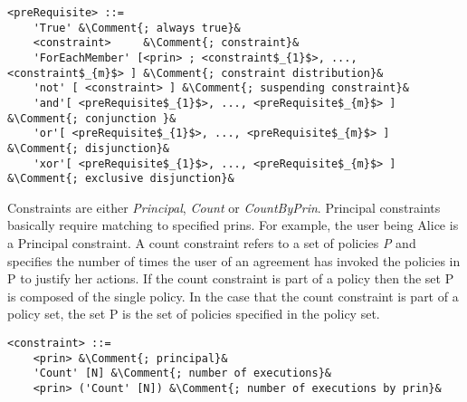 
\lstset{mathescape, language=AST, escapechar=\&}  
\begin{lstlisting}[frame=single, caption={preRequisite},label={lst:preRequisiteast}]
<preRequisite> ::=  
	'True' &\Comment{; always true}&
	<constraint>	 &\Comment{; constraint}&
	'ForEachMember' [<prin> ; <constraint$_{1}$>, ..., <constraint$_{m}$> ]	&\Comment{; constraint distribution}&
	'not' [ <constraint> ] &\Comment{; suspending constraint}&
	'and'[ <preRequisite$_{1}$>, ..., <preRequisite$_{m}$> ] &\Comment{; conjunction }&
	'or'[ <preRequisite$_{1}$>, ..., <preRequisite$_{m}$> ] &\Comment{; disjunction}&
	'xor'[ <preRequisite$_{1}$>, ..., <preRequisite$_{m}$> ] &\Comment{; exclusive disjunction}&
\end{lstlisting}

Constraints are either \emph{Principal}, \emph{Count} or \emph{CountByPrin}. Principal constraints basically require matching to specified prins. For example, the user being Alice is a Principal constraint. A count constraint refers to a set of policies \emph{P} and specifies the number of times the user of an agreement has invoked the policies in P to justify her actions. If the count constraint is part of a policy then the set P is composed of the single policy. In the case that the count constraint is part of a policy set, the set P is the set of policies specified in the policy set.

\lstset{mathescape, language=AST, escapechar=\&}  
\begin{lstlisting}[frame=single, caption={constraint},label={lst:constraintast}]
<constraint> ::=  
	<prin> &\Comment{; principal}&
	'Count' [N] &\Comment{; number of executions}&
	<prin> ('Count' [N]) &\Comment{; number of executions by prin}&
\end{lstlisting}
